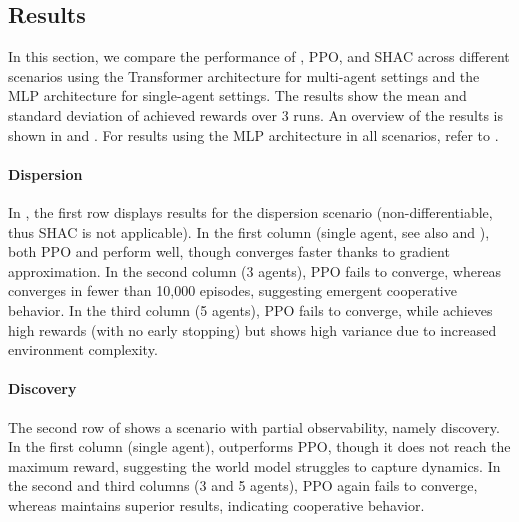 \subsection{Results}
In this section, we compare the performance of \fname{}, PPO, and SHAC across different scenarios using the Transformer architecture for multi-agent settings and the MLP architecture for single-agent settings. The results show the mean and standard deviation of achieved rewards over 3 runs. An overview of the results is shown in  and . For results using the MLP architecture in all scenarios, refer to .

\paragraph{Dispersion}
In , the first row displays results for the dispersion scenario (non-differentiable, thus SHAC is not applicable). In the first column (single agent, see also  and ), both PPO and \fname{} perform well, though \fname{} converges faster thanks to gradient approximation. In the second column (3 agents), PPO fails to converge, whereas \fname{} converges in fewer than 10,000 episodes, suggesting emergent cooperative behavior. In the third column (5 agents), PPO fails to converge, while \fname{} achieves high rewards (with no early stopping) but shows high variance due to increased environment complexity.

\paragraph{Discovery} 
The second row of  shows a scenario with partial observability, namely discovery. In the first column (single agent), \fname{} outperforms PPO, though it does not reach the maximum reward, suggesting the world model struggles to capture dynamics. In the second and third columns (3 and 5 agents), PPO again fails to converge, whereas \fname{} maintains superior results, indicating cooperative behavior.

